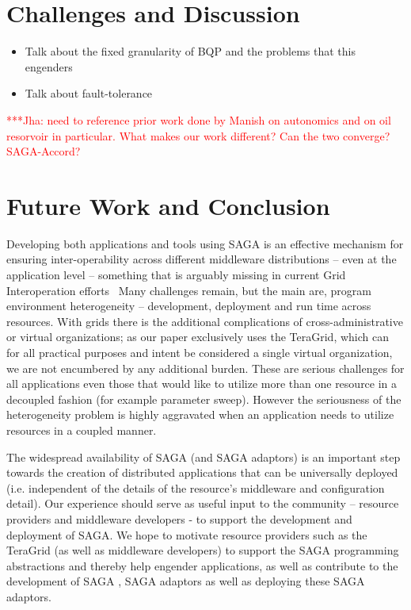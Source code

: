 \documentclass[conference,final]{IEEEtran}
\newcommand{\jha}[0]{}
\newcommand{\jhanote}[1]{ {\textcolor{red} { ***Jha: #1 }}}
\begin{document}

\section{Challenges and Discussion}

\begin{itemize}
\item Talk about the fixed granularity of BQP and the problems that this
engenders
\item Talk about fault-tolerance
\end{itemize}


\jhanote{need to reference prior work done by Manish on autonomics and
  on oil resorvoir in particular. What makes our work different?  Can
  the two converge? SAGA-Accord?}

\section{Future Work and Conclusion}

Developing both applications and tools using SAGA is an effective
mechanism for ensuring inter-operability across different middleware
distributions -- even at the application level -- something that is
arguably missing in current Grid Interoperation
efforts~\cite{gin_paper} Many challenges remain, but the main are,
program environment heterogeneity -- development, deployment and run
time across resources.  With grids there is the additional
complications of cross-administrative or virtual organizations; as our
paper exclusively uses the TeraGrid, which can for all practical
purposes and intent be considered a single virtual organization, we
are not encumbered by any additional burden. These are serious
challenges for all applications even those that would like to utilize
more than one resource in a decoupled fashion (for example parameter
sweep).  However the seriousness of the heterogeneity problem is
highly aggravated when an application needs to utilize resources in a
coupled manner.

The widespread availability of SAGA (and SAGA adaptors) is an
important step towards the creation of distributed applications that
can be universally deployed (i.e.  independent of the details of the
resource's middleware and configuration detail).  Our experience
should serve as useful input to the community -- resource providers
and middleware developers - to support the development and deployment
of SAGA.  We hope to motivate  resource providers such as the TeraGrid
(as well as middleware developers) to support the SAGA programming
abstractions and thereby help engender applications, as well as
contribute to the development of SAGA , SAGA adaptors as well as
deploying these SAGA adaptors.
\end{document}
